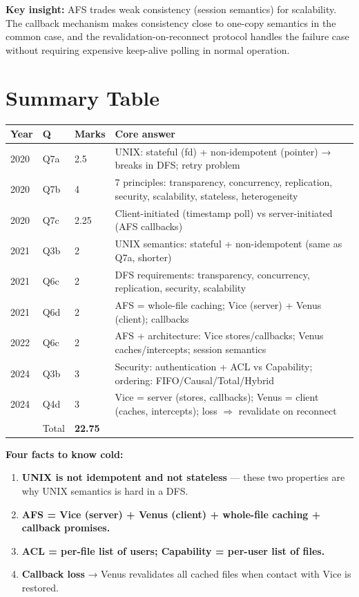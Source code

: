 \documentclass[12pt,a4paper]{article}
\begin{document}
\textbf{Key insight:} AFS trades weak consistency (session semantics) for scalability. The callback mechanism makes consistency close to one-copy semantics in the common case, and the revalidation-on-reconnect protocol handles the failure case without requiring expensive keep-alive polling in normal operation.

\section{Summary Table}

\begin{center}
\begin{tabular}{@{}llll@{}}
\toprule
Year & Q & Marks & Core answer \\
\midrule
2020 & Q7a & 2.5 & UNIX: stateful (fd) + non-idempotent (pointer) → breaks in DFS; retry problem \\
2020 & Q7b & 4 & 7 principles: transparency, concurrency, replication, security, scalability, stateless, heterogeneity \\
2020 & Q7c & 2.25 & Client-initiated (timestamp poll) vs server-initiated (AFS callbacks) \\
2021 & Q3b & 2 & UNIX semantics: stateful + non-idempotent (same as Q7a, shorter) \\
2021 & Q6c & 2 & DFS requirements: transparency, concurrency, replication, security, scalability \\
2021 & Q6d & 2 & AFS = whole-file caching; Vice (server) + Venus (client); callbacks \\
2022 & Q6c & 2 & AFS + architecture: Vice stores/callbacks; Venus caches/intercepts; session semantics \\
2024 & Q3b & 3 & Security: authentication + ACL vs Capability; ordering: FIFO/Causal/Total/Hybrid \\
2024 & Q4d & 3 & Vice = server (stores, callbacks); Venus = client (caches, intercepts); loss $\Rightarrow$ revalidate on reconnect \\
\midrule
 & Total & \textbf{22.75} & \\
\bottomrule
\end{tabular}
\end{center}

\textbf{Four facts to know cold:}
\begin{enumerate}[noitemsep]
  \item \textbf{UNIX is not idempotent and not stateless} --- these two properties are why UNIX semantics is hard in a DFS.
  \item \textbf{AFS = Vice (server) + Venus (client) + whole-file caching + callback promises.}
  \item \textbf{ACL = per-file list of users; Capability = per-user list of files.}
  \item \textbf{Callback loss} → Venus revalidates all cached files when contact with Vice is restored.
\end{enumerate}
\end{document}
